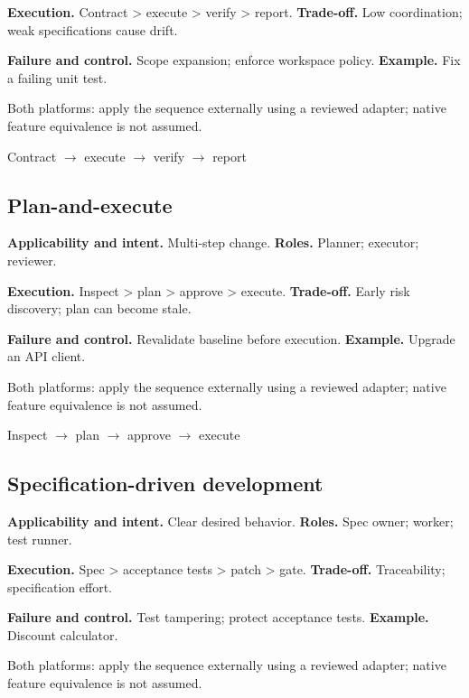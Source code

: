 \textbf{Execution.} Contract > execute > verify > report. \textbf{Trade-off.} Low coordination; weak specifications cause drift.

\textbf{Failure and control.} Scope expansion; enforce workspace policy. \textbf{Example.} Fix a failing unit test.

Both platforms: apply the sequence externally using a reviewed adapter; native feature equivalence is not assumed.

\begin{center}\small \textsf{Contract} $\rightarrow$ \textsf{execute} $\rightarrow$ \textsf{verify} $\rightarrow$ \textsf{report}\end{center}

\subsection{Plan-and-execute}

\textbf{Applicability and intent.} Multi-step change. \textbf{Roles.} Planner; executor; reviewer.

\textbf{Execution.} Inspect > plan > approve > execute. \textbf{Trade-off.} Early risk discovery; plan can become stale.

\textbf{Failure and control.} Revalidate baseline before execution. \textbf{Example.} Upgrade an API client.

Both platforms: apply the sequence externally using a reviewed adapter; native feature equivalence is not assumed.

\begin{center}\small \textsf{Inspect} $\rightarrow$ \textsf{plan} $\rightarrow$ \textsf{approve} $\rightarrow$ \textsf{execute}\end{center}

\subsection{Specification-driven development}

\textbf{Applicability and intent.} Clear desired behavior. \textbf{Roles.} Spec owner; worker; test runner.

\textbf{Execution.} Spec > acceptance tests > patch > gate. \textbf{Trade-off.} Traceability; specification effort.

\textbf{Failure and control.} Test tampering; protect acceptance tests. \textbf{Example.} Discount calculator.

Both platforms: apply the sequence externally using a reviewed adapter; native feature equivalence is not assumed.

